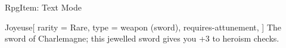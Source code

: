 \begin{ExampleBlock}{RpgItem: Text Mode}
\begin{RpgItem}{Joyeuse}[
    rarity = Rare,
    type = weapon (sword),
    requires-attunement, %
]
    The sword of Charlemagne; this jewelled sword gives you +3 to heroism checks.
\end{RpgItem}


\end{ExampleBlock}

